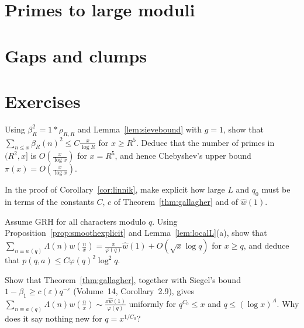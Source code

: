 \section{Primes to large moduli}\label{ch:largemoduli}



\section{Gaps and clumps}



\section{Exercises}

\begin{exercise}[$\star$]\label{ex:sieveupper}
Using $\beta_R^2=1*\rho_{R,R}$ and Lemma~\ref{lem:sievebound} with $g=1$, show that $\sum_{n\le x}\beta_R(n)^2\le C\frac x{\log R}$ for $x\ge R^5$. Deduce that the number of primes in $(R^2,x]$ is $O(\frac x{\log x})$ for $x=R^5$, and hence Chebyshev's upper bound $\pi(x)=O(\frac x{\log x})$.
\end{exercise}

\begin{exercise}[$\star$]\label{ex:linnikdetail}
In the proof of Corollary~\ref{cor:linnik}, make explicit how large $L$ and $q_0$ must be in terms of the constants $C$, $c$ of Theorem~\ref{thm:gallagher} and of $\hat w(1)$.
\end{exercise}

\begin{exercise}[$\star\star$]\label{ex:grhlinnik}
Assume GRH for all characters modulo $q$. Using Proposition~\ref{prop:smoothexplicit} and Lemma~\ref{lem:localL}(a), show that $\sum_{n\equiv a\,(q)}\Lambda(n)w(\frac nx)=\frac x{\varphi(q)}\hat w(1)+O(\sqrt x\log q)$ for $x\ge q$, and deduce that $p(q,a)\le C\varphi(q)^2\log^2q$.
\end{exercise}

\begin{exercise}[$\star\star$]\label{ex:siegelwalfisz}
Show that Theorem~\ref{thm:gallagher}, together with Siegel's bound $1-\beta_1\ge c(\varepsilon)q^{-\varepsilon}$ (Volume~14, Corollary~2.9), gives $\sum_{n\equiv a\,(q)}\Lambda(n)w(\frac nx)\sim\frac{x\hat w(1)}{\varphi(q)}$ uniformly for $q^{C_0}\le x$ and $q\le(\log x)^A$. Why does it say nothing new for $q=x^{1/C_0}$?
\end{exercise}

